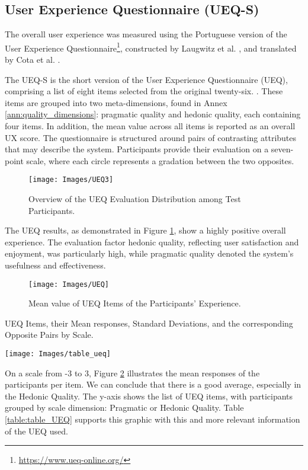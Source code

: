 \subsection{User Experience Questionnaire (UEQ-S)}

The overall user experience was measured using the Portuguese version of the User Experience Questionnaire\footnote{\url{https://www.ueq-online.org/}}, constructed by Laugwitz et al. \cite{inproceedings}, and translated by Cota et al. \cite{article_t}.

The UEQ-S is the short version of the User Experience Questionnaire (UEQ), comprising a list of eight items selected from the original twenty-six. \cite{article_ueq}. These items are grouped into two meta-dimensions, found in Annex \ref{ann:quality_dimensions}: pragmatic quality and hedonic quality, each containing four items.
In addition, the mean value across all items is reported as an overall \gls{UX} score.
The questionnaire is structured around pairs of contrasting attributes that may describe the system. Participants provide their evaluation on a seven-point scale, where each circle represents a gradation between the two opposites.

\begin{figure}[h!]
    \centering
    \texttt{[image: Images/UEQ3]}
    \caption{Overview of the \gls{UEQ} Evaluation Distribution among Test Participants.} 
    \label{fig:UEQ2}
\end{figure}


The \gls{UEQ} results, as demonstrated in Figure \ref{fig:UEQ2}, show a highly positive overall experience. 
The evaluation factor hedonic quality, reflecting user satisfaction and enjoyment, was particularly high, while pragmatic quality denoted the system’s usefulness and effectiveness.
\begin{figure}[h!]
    \centering
    \texttt{[image: Images/UEQ]}
    \caption{Mean value of \gls{UEQ} Items of the Participants' Experience.} 
    \label{fig:UEQ1}
\end{figure}
\begin{table}[h!]
    \caption{\gls{UEQ} Items, their Mean responses, Standard Deviations, and the corresponding Opposite Pairs by Scale.}
    \centering
    \texttt{[image: Images/table\_ueq]}
    \label{table:table_UEQ}
\end{table}


On a scale from -3 to 3, Figure \ref{fig:UEQ1} illustrates the mean responses of the participants per item.  
We can conclude that there is a good average, especially in the Hedonic Quality.  
The y-axis shows the list of \gls{UEQ} items, with participants grouped by scale dimension: Pragmatic or Hedonic Quality.  
Table \ref{table:table_UEQ} supports this graphic with this and more relevant information of the \gls{UEQ} used.

